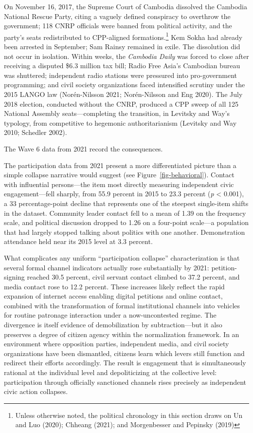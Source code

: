 \documentclass[Review,times,sageh,doublespace]{sagej}
\begin{document}
On November 16, 2017, the Supreme Court of Cambodia dissolved the
Cambodia National Rescue Party, citing a vaguely defined conspiracy to
overthrow the government; 118 CNRP officials were banned from political
activity, and the party's seats redistributed to CPP-aligned
formations.\footnote{Unless otherwise noted, the political chronology in
  this section draws on Un and Luo (2020); Chheang (2021); and
  Morgenbesser and Pepinsky (2019)} Kem Sokha had already been arrested
in September; Sam Rainsy remained in exile. The dissolution did not
occur in isolation. Within weeks, the \emph{Cambodia Daily} was forced
to close after receiving a disputed \$6.3 million tax bill; Radio Free
Asia's Cambodian bureau was shuttered; independent radio stations were
pressured into pro-government programming; and civil society
organizations faced intensified scrutiny under the 2015 LANGO law
(Norén-Nilsson 2021; Norén-Nilsson and Eng 2020). The July 2018
election, conducted without the CNRP, produced a CPP sweep of all 125
National Assembly seats---completing the transition, in Levitsky and
Way's typology, from competitive to hegemonic authoritarianism (Levitsky
and Way 2010; Schedler 2002).

The Wave 6 data from 2021 record the consequences.

The participation data from 2021 present a more differentiated picture
than a simple collapse narrative would suggest (see
Figure~\ref{fig-behavioral}). Contact with influential persons---the
item most directly measuring independent civic engagement---fell
sharply, from 55.9 percent in 2015 to 23.3 percent (\emph{p} \textless{}
0.001), a 33 percentage-point decline that represents one of the
steepest single-item shifts in the dataset. Community leader contact
fell to a mean of 1.39 on the frequency scale, and political discussion
dropped to 1.26 on a four-point scale---a population that had largely
stopped talking about politics with one another. Demonstration
attendance held near its 2015 level at 3.3 percent.

What complicates any uniform ``participation collapse'' characterization
is that several formal channel indicators actually rose substantially by
2021: petition-signing reached 30.5 percent, civil servant contact
climbed to 37.2 percent, and media contact rose to 12.2 percent. These
increases likely reflect the rapid expansion of internet access enabling
digital petitions and online contact, combined with the transformation
of formal institutional channels into vehicles for routine patronage
interaction under a now-uncontested regime. The divergence is itself
evidence of demobilization by subtraction---but it also preserves a
degree of citizen agency within the normalization framework. In an
environment where opposition parties, independent media, and civil
society organizations have been dismantled, citizens learn which levers
still function and redirect their efforts accordingly. The result is
engagement that is simultaneously rational at the individual level and
depoliticizing at the collective level: participation through officially
sanctioned channels rises precisely as independent civic action
collapses.
\end{document}
